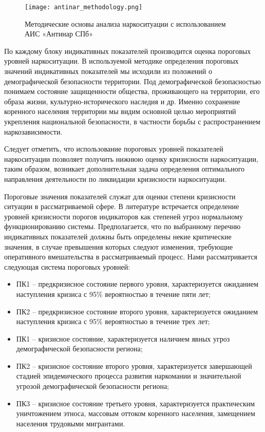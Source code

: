 \begin{figure}
    \texttt{[image: antinar\_methodology.png]}
    \caption{Методические основы анализа наркоситуации с использованием АИС
    «Антинар СПб»}
    \label{fig:antinar_methodology}
\end{figure}

По каждому блоку индикативных показателей производится оценка пороговых уровней
наркоситуации. В используемой методике определения пороговых значений
индикативных показателей мы исходили из положений о демографической безопасности
территории. Под демографической безопасностью понимаем состояние защищенности
общества, проживающего на территории, его образа жизни, культурно-исторического
наследия и др. Именно сохранение коренного населения территории мы видим
основной целью мероприятий укрепления национальной безопасности, в частности
борьбы с распространением наркозависимости.

Следует отметить, что использование пороговых уровней показателей наркоситуации
позволяет получить нижнюю оценку кризисности наркоситуации, таким образом,
возникает дополнительная задача определения оптимального направления
деятельности по ликвидации кризисности наркоситуации.

Пороговые значения показателей служат для оценки степени кризисности ситуации в
рассматриваемой сфере. В литературе встречается определение уровней
кризисности порогов индикаторов как степеней угроз нормальному функционированию
системы. Предполагается, что по выбранному перечню индикативных показателей
должны быть определены некие критические значения, в случае превышения которых
следуют изменения, требующие оперативного вмешательства в рассматриваемый
процесс. Нами рассматривается следующая система пороговых уровней:
\begin{itemize}
\item[] ПК1 – предкризисное состояние первого уровня, характеризуется ожиданием
наступления кризиса с 95\% вероятностью в течение пяти лет;
\item[] ПК2 – предкризисное состояние второго уровня, характеризуется ожиданием
наступления кризиса с 95\% вероятностью в течение трех лет;
\item[] ПК1 – кризисное состояние, характеризуется наличием явных угроз демографической
безопасности региона;
\item[] ПК2 – кризисное состояние второго уровня, характеризуется завершающей стадией
эпидемического процесса развития наркомании и значительной угрозой
демографической безопасности региона;
\item[] ПК3 – кризисное состояние третьего уровня, характеризуется практическим
уничтожением этноса, массовым оттоком коренного населения, замещением населения
трудовыми мигрантами.
\end{itemize}

